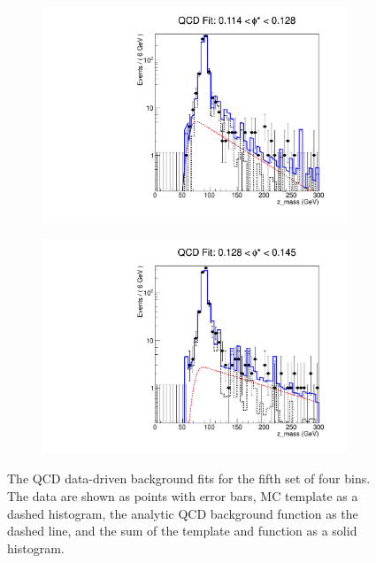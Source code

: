 \begin{figure}[!htbp]
\begin{subfigure}[b]{0.5\textwidth}
        \includegraphics[width=\linewidth]{figures/qcd_fits/qcd_fit_plot_for_19.pdf}
        \caption{}
        \label{fig:qcd_fit_19}
    \end{subfigure}%
    \begin{subfigure}[b]{0.5\textwidth}
        \includegraphics[width=\linewidth]{figures/qcd_fits/qcd_fit_plot_for_20.pdf}
        \caption{}
        \label{fig:qcd_fit_20}
    \end{subfigure}
    \caption{
       The QCD data-driven background fits for the fifth set of four \phistar
       bins. The data are shown as points with error bars, MC template as a
       dashed histogram, the analytic QCD background function as the dashed
       line, and the sum of the template and function as a solid histogram.
    }
    \label{fig:qcd_many_5}
\end{figure}

